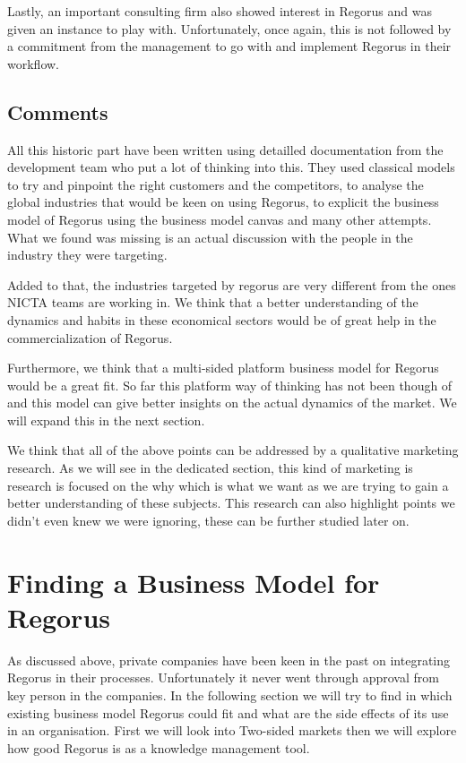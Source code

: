 \documentclass[10pt]{report}
\begin{document}
Lastly, an important consulting firm also showed interest in Regorus and was given an instance to play with. Unfortunately, once again, this is not followed by a commitment from the management to go with and implement Regorus in their workflow.

\subsection{Comments}

All this historic part have been written using detailled documentation from the development team who put a lot of thinking into this. They used classical models to try and pinpoint the right customers and the competitors, to analyse the global industries that would be keen on using Regorus, to explicit the business model of Regorus using the business model canvas and many other attempts. What we found was missing is an actual discussion with the people in the industry they were targeting.

Added to that, the industries targeted by regorus are very different from the ones NICTA teams are working in. We think that a better understanding of the dynamics and habits in these economical sectors would be of great help in the commercialization of Regorus.

Furthermore, we think that a multi-sided platform business model for Regorus would be a great fit. So far this platform way of thinking has not been though of and this model can give better insights on the actual dynamics of the market. We will expand this in the next section.

We think that all of the above points can be addressed by a qualitative marketing research. As we will see in the dedicated section, this kind of marketing is research is focused on the why which is what we want as we are trying to gain a better understanding of these subjects. This research can also highlight points we didn't even knew we were ignoring, these can be further studied later on.

\section{Finding a Business Model for Regorus}

As discussed above, private companies have been keen in the past on integrating Regorus in their processes. Unfortunately it never went through approval from key person in the companies. In the following section we will try to find in which existing business model Regorus could fit and what are the side effects of its use in an organisation. First we will look into Two-sided markets then we will explore how good Regorus is as a knowledge management tool.
\end{document}
